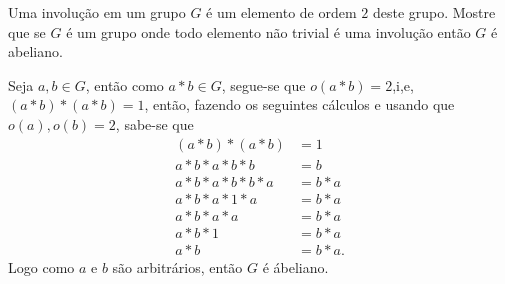 \begin{homeworkProblem}
  Uma involução em um grupo $G$ é um elemento de ordem $2$ deste grupo. Mostre que se $G$ é um grupo onde todo elemento não trivial é uma involução então $G$ é abeliano. 
  \begin{solution}
    Seja $a,b\in G$, então como $a*b\in G$, segue-se que $o(a*b)=2$,i,e, $(a*b)*(a*b)=1$, então, fazendo os seguintes cálculos e usando que $o(a),o(b)=2$, sabe-se que
    \begin{align*}
      (a*b)*(a*b)&=1\\
      a*b*a*b*b&=b\\
      a*b*a*b*b*a&=b*a\\
      a*b*a*1*a&=b*a\\
      a*b*a*a&=b*a\\
      a*b*1&=b*a\\
      a*b&=b*a.
    \end{align*}
    Logo como $a$ e $b$ são arbitrários, então $G$ é ábeliano. 
  \end{solution}
\end{homeworkProblem}
